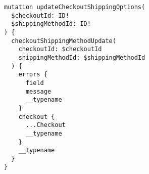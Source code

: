 \documentclass{article}
\begin{document}
\begin{verbatim}
mutation updateCheckoutShippingOptions(
  $checkoutId: ID!
  $shippingMethodId: ID!
) {
  checkoutShippingMethodUpdate(
    checkoutId: $checkoutId
    shippingMethodId: $shippingMethodId
  ) {
    errors {
      field
      message
      __typename
    }
    checkout {
      ...Checkout
      __typename
    }
    __typename
  }
}
\end{verbatim}
\end{document}
